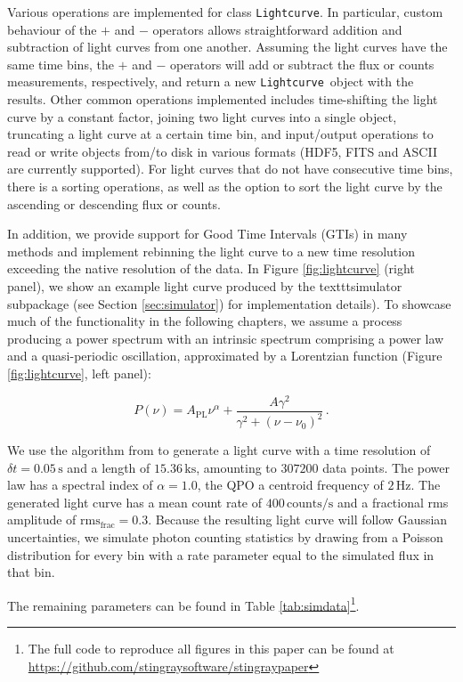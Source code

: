 \documentclass[12pt]{emulateapj}
\newcommand{\lightcurve}{\texttt{Lightcurve}\xspace}
\begin{document}
Various operations are implemented for class \lightcurve. In particular, custom behaviour of the $+$ and $-$ operators allows straightforward addition and subtraction of light curves from one another. Assuming the light curves have the same time bins, the $+$ and $-$ operators will add or subtract the flux or counts measurements, respectively, and return a new \lightcurve\ object with the results. Other common operations implemented includes time-shifting the light curve by a constant factor, joining two light curves into a single object, truncating a light curve at a certain time bin, and input/output operations to read or write objects from/to disk in various formats (HDF5, FITS and ASCII are currently supported). For light curves that do not have consecutive time bins, there is a sorting operations, as well as the option to sort the light curve by the ascending or descending flux or counts. 

In addition, we provide support for Good Time Intervals (GTIs) in many methods and implement rebinning the light curve to a new time resolution exceeding the native resolution of the data. In Figure \ref{fig:lightcurve} (right panel), we show an example light curve produced by the texttt{simulator} subpackage (see Section \ref{sec:simulator}) for implementation details). To showcase much of the functionality in the following chapters, we assume a process producing a power spectrum with an intrinsic spectrum comprising a power law and a quasi-periodic oscillation, approximated by a Lorentzian function (Figure \ref{fig:lightcurve}, left panel):

\[
P(\nu) = A_{\mathrm{PL}} \nu^{\alpha} + \frac{A \gamma^2}{\gamma^2 + (\nu - \nu_0)^2} \, .
\]

We use the algorithm from \citet{timmer1995} to generate a light curve with a time resolution of $\delta t = 0.05\,\mathrm{s}$ and a length of $15.36 \,\mathrm{ks}$, amounting to $307200$ data points. The power law has a spectral index of $\alpha = 1.0$, the QPO a centroid frequency of $2 \,\mathrm{Hz}$. The generated light curve has a mean count rate of $400\,\mathrm{counts/s}$ and a fractional rms amplitude of $\mathrm{rms}_\mathrm{frac} = 0.3$. Because the resulting light curve will follow Gaussian uncertainties, we simulate photon counting statistics by drawing from a Poisson distribution for every bin with a rate parameter equal to the simulated flux in that bin. 

The remaining parameters can be found in Table \ref{tab:simdata}\footnote{The full code to reproduce all figures in this paper can be found at \url{https://github.com/stingraysoftware/stingraypaper}}. 
\end{document}
